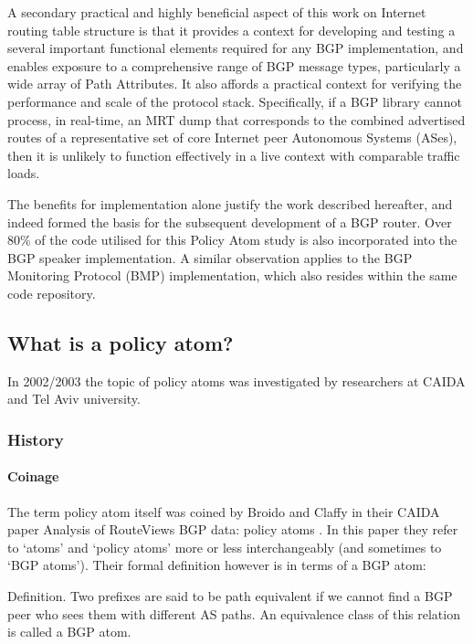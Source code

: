 \medskip

A secondary practical and highly beneficial aspect of this work on  Internet routing table structure is that it provides a context for developing and testing a several important functional elements required for any BGP implementation, and enables exposure to a comprehensive range of BGP message types, particularly a wide array of Path Attributes.
It also affords a practical context for verifying the performance and scale of the protocol stack.
Specifically, if a BGP library cannot process, in real-time, an MRT dump that corresponds to the combined advertised routes of a representative set of core Internet peer Autonomous Systems (ASes), then it is unlikely to function effectively in a live context with comparable traffic loads.

\medskip

The benefits for implementation alone justify the work described hereafter, and indeed formed the basis for the subsequent development of a BGP router. Over 80\% of the code utilised for this Policy Atom study is also incorporated into the BGP speaker implementation. A similar observation applies to the BGP Monitoring Protocol (BMP) implementation, which also resides within the same code repository.

\subsection{What is a policy atom?}

In 2002/2003 the topic of policy atoms was investigated by researchers at CAIDA and Tel Aviv university.

\subsubsection{History}

\paragraph{Coinage}

The term policy atom itself was coined by Broido and Claffy in their CAIDA paper  Analysis of RouteViews BGP data: policy atoms \cite{Broido2001AnalysisAtoms}. In this paper they refer to `atoms' and `policy atoms' more or less interchangeably (and sometimes to `BGP atoms'). Their formal definition however is in terms of a BGP atom:

Definition. Two prefixes are said to be path equivalent if we cannot find a BGP peer who sees them with different AS paths. An equivalence class of this relation is called a BGP atom.

